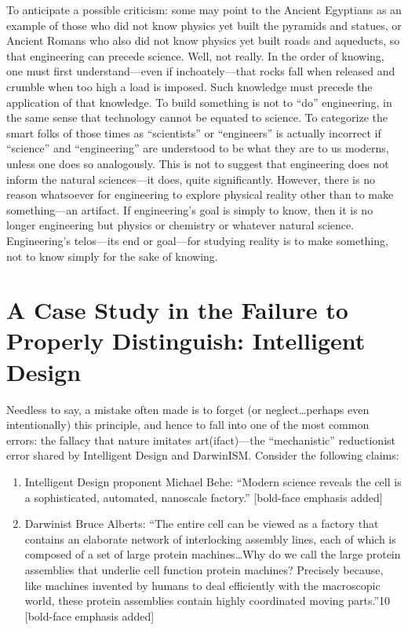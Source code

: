 To anticipate a possible criticism: some may point to the Ancient Egyptians as an example of those who did not know physics yet built the pyramids and statues, or Ancient Romans who also did not know physics yet built roads and aqueducts, so that engineering can precede science. Well, not really. In the order of knowing, one must first understand---even if inchoately---that rocks fall when released and crumble when too high a load is imposed. Such knowledge must precede the application of that knowledge. To build something is not to ``do'' engineering, in the same sense that technology cannot be equated to science. To categorize the smart folks of those times as ``scientists'' or ``engineers'' is actually incorrect if ``science'' and ``engineering'' are understood to be what they are to us moderns, unless one does so analogously. This is not to suggest that engineering does not inform the natural sciences---it does, quite significantly. However, there is no reason whatsoever for engineering to explore physical reality other than to make something---an artifact. If engineering’s goal is simply to know, then it is no longer engineering but physics or chemistry or whatever natural science. Engineering’s telos---its end or goal---for studying reality is to make something, not to know simply for the sake of knowing.

\section{A Case Study in the Failure to Properly Distinguish: Intelligent Design}

Needless to say, a mistake often made is to forget (or neglect\ldots perhaps even intentionally) this principle, and hence to fall into one of the most common errors: the fallacy that nature imitates art(ifact)---the ``mechanistic'' reductionist error shared by Intelligent Design and DarwinISM. Consider the following claims:

\begin{enumerate}
\item Intelligent Design proponent Michael Behe: ``Modern science reveals the cell is a sophisticated, automated, nanoscale factory.''\cite{beheinterview} [bold-face emphasis added]
\item Darwinist Bruce Alberts: ``The entire cell can be viewed as a factory that contains an elaborate network of interlocking assembly lines, each of which is composed of a set of large protein machines\ldots Why do we call the large protein assemblies that underlie cell function protein machines? Precisely because, like machines invented by humans to deal efficiently with the macroscopic world, these protein assemblies contain highly coordinated moving parts.''10 [bold-face emphasis added]
\end{enumerate}


